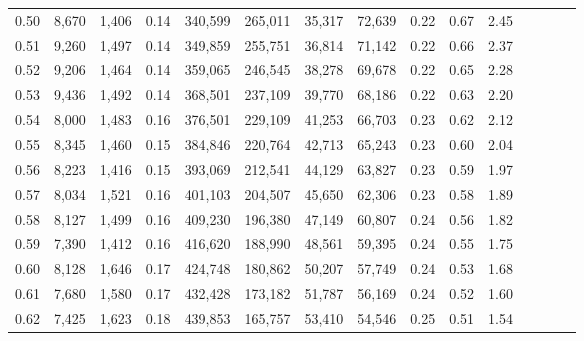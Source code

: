 \begin{tabular}{rrrcrrrrrrrrrrr}
0.50 &   8,670 &  1,406 &                                       0.14 &  340,599 &  265,011 &   35,317 &   72,639 &  0.22 &  0.67 &                         2.45 \\
0.51 &   9,260 &  1,497 &                                       0.14 &  349,859 &  255,751 &   36,814 &   71,142 &  0.22 &  0.66 &                         2.37 \\
0.52 &   9,206 &  1,464 &                                       0.14 &  359,065 &  246,545 &   38,278 &   69,678 &  0.22 &  0.65 &                         2.28 \\
0.53 &   9,436 &  1,492 &                                       0.14 &  368,501 &  237,109 &   39,770 &   68,186 &  0.22 &  0.63 &                         2.20 \\
0.54 &   8,000 &  1,483 &                                       0.16 &  376,501 &  229,109 &   41,253 &   66,703 &  0.23 &  0.62 &                         2.12 \\
0.55 &   8,345 &  1,460 &                                       0.15 &  384,846 &  220,764 &   42,713 &   65,243 &  0.23 &  0.60 &                         2.04 \\
0.56 &   8,223 &  1,416 &                                       0.15 &  393,069 &  212,541 &   44,129 &   63,827 &  0.23 &  0.59 &                         1.97 \\
0.57 &   8,034 &  1,521 &                                       0.16 &  401,103 &  204,507 &   45,650 &   62,306 &  0.23 &  0.58 &                         1.89 \\
0.58 &   8,127 &  1,499 &                                       0.16 &  409,230 &  196,380 &   47,149 &   60,807 &  0.24 &  0.56 &                         1.82 \\
0.59 &   7,390 &  1,412 &                                       0.16 &  416,620 &  188,990 &   48,561 &   59,395 &  0.24 &  0.55 &                         1.75 \\
0.60 &   8,128 &  1,646 &                                       0.17 &  424,748 &  180,862 &   50,207 &   57,749 &  0.24 &  0.53 &                         1.68 \\
0.61 &   7,680 &  1,580 &                                       0.17 &  432,428 &  173,182 &   51,787 &   56,169 &  0.24 &  0.52 &                         1.60 \\
0.62 &   7,425 &  1,623 &                                       0.18 &  439,853 &  165,757 &   53,410 &   54,546 &  0.25 &  0.51 &                         1.54 \\

\end{tabular}

